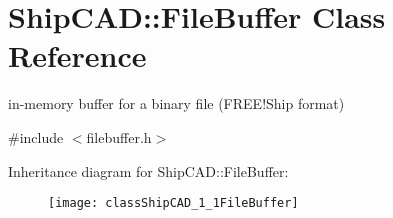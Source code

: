 \hypertarget{classShipCAD_1_1FileBuffer}{}\section{Ship\+C\+AD\+:\+:File\+Buffer Class Reference}
\label{classShipCAD_1_1FileBuffer}


in-\/memory buffer for a binary file (F\+R\+E\+E!\+Ship format)  




{\ttfamily \#include $<$filebuffer.\+h$>$}

Inheritance diagram for Ship\+C\+AD\+:\+:File\+Buffer\+:\begin{figure}[H]
\begin{center}
\leavevmode
\texttt{[image: classShipCAD\_1\_1FileBuffer]}
\end{center}
\end{figure}
